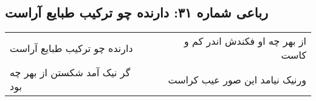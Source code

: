 \begin{center}
\section*{رباعی شماره ۳۱: دارنده چو ترکیب طبایع آراست}
\label{sec:sh031}
\begin{longtable}{l p{0.5cm} r}
دارنده چو ترکیب طبایع آراست
&&
از بهر چه او فکندش اندر کم و کاست
\\
گر نیک آمد شکستن از بهر چه بود
&&
ورنیک نیامد این صور عیب کراست
\\
\end{longtable}
\end{center}
